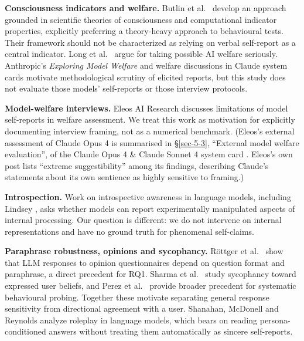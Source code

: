 \documentclass[11pt]{article}
\begin{document}
\textbf{Consciousness indicators and welfare.} Butlin et al.~\citeyearpar{butlin2023consciousness} develop an approach grounded in scientific theories of consciousness and computational indicator properties, explicitly preferring a theory-heavy approach to behavioural tests. Their framework should not be characterized as relying on verbal self-report as a central indicator. Long et al.~\citeyearpar{long2024welfare} argue for taking possible AI welfare seriously. Anthropic's \emph{Exploring Model Welfare} \citeyearpar{anthropic2025welfare} and welfare discussions in Claude system cards \citep{anthropic2025opus4,anthropic2026opus46} motivate methodological scrutiny of elicited reports, but this study does not evaluate those models' self-reports or those interview protocols.

\textbf{Model-welfare interviews.} Eleos AI Research \citeyearpar{eleos2025selfreports} discusses limitations of model self-reports in welfare assessment. We treat this work as motivation for explicitly documenting interview framing, not as a numerical benchmark. (Eleos's external assessment of Claude Opus 4 is summarised in §\ref{sec-5-3}, ``External model welfare evaluation'', of the Claude Opus 4 \& Claude Sonnet 4 system card \citep{anthropic2025opus4}. Eleos's own post \citep{eleos2025selfreports} lists ``extreme suggestibility'' among its findings, describing Claude's statements about its own sentience as highly sensitive to framing.)

\textbf{Introspection.} Work on introspective awareness in language models, including Lindsey \citeyearpar{lindsey2025introspection}, asks whether models can report experimentally manipulated aspects of internal processing. Our question is different: we do not intervene on internal representations and have no ground truth for phenomenal self-claims.

\textbf{Paraphrase robustness, opinions and sycophancy.} Röttger et al.~\citeyearpar{rottger2024compass} show that LLM responses to opinion questionnaires depend on question format and paraphrase, a direct precedent for RQ1. Sharma et al.~\citeyearpar{sharma2023sycophancy} study sycophancy toward expressed user beliefs, and Perez et al.~\citeyearpar{perez2022modelwritten} provide broader precedent for systematic behavioural probing. Together these motivate separating general response sensitivity from directional agreement with a user. Shanahan, McDonell and Reynolds \citeyearpar{shanahan2023roleplay} analyze roleplay in language models, which bears on reading persona-conditioned answers without treating them automatically as sincere self-reports.
\end{document}
